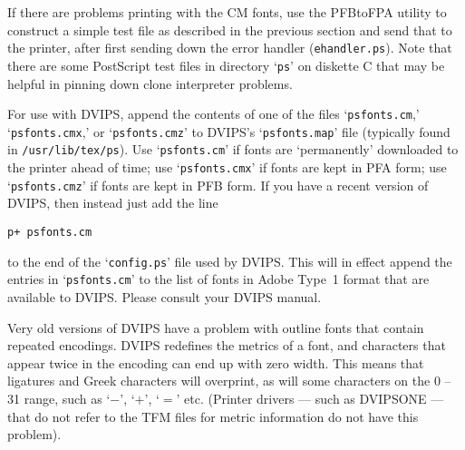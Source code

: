 If there are problems printing with the CM fonts, use the PFBtoFPA utility
to construct a simple test file as described in the previous section and
send that to the printer, after first sending down the error handler
({\tt ehandler.ps}).  
%
Note that there are some PostScript test files in directory `{\tt ps}' on
diskette C %
that may be helpful in pinning down clone interpreter problems.




For use with DVIPS, append the contents of one of the files `{\tt psfonts.cm},'
`{\tt psfonts.cmx},' or `{\tt psfonts.cmz}' to DVIPS's `{\tt psfonts.map}' file
(typically found in \verb|/usr/lib/tex/ps|).  
Use `{\tt psfonts.cm}'
if fonts are `permanently' downloaded to the printer ahead of time;
use `{\tt psfonts.cmx}' if fonts are kept in PFA form;
use `{\tt psfonts.cmz}' if fonts are kept in PFB form.
If you have a recent version of DVIPS, then instead just add the line

\verb|p+ psfonts.cm|

\noindent
to the end of the `{\tt config.ps}' file used by DVIPS.   This will in effect 
append the entries in `{\tt psfonts.cm}' to the list of fonts in Adobe Type~1
format that are available to DVIPS.  Please consult your DVIPS manual.

Very old versions of DVIPS have a problem with outline fonts that
contain repeated encodings. DVIPS redefines the metrics of a font, and
characters that appear twice in the encoding can end up with zero width.
This means that ligatures and Greek characters will overprint,
as will some characters on the 0 -- 31 range, such as 
`$-$', `$+$', `$=$' etc. 
(Printer drivers --- such as DVIPSONE --- that do not refer to the TFM files
for metric information do not have this problem).

